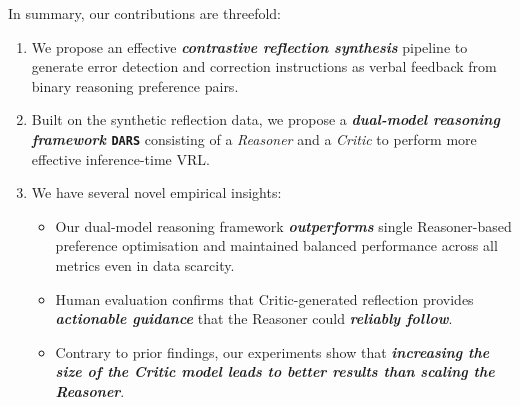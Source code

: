 In summary, our contributions are threefold:
\begin{enumerate}[leftmargin=*,noitemsep,topsep=0pt]
    \item We propose an effective \textbf{\emph{contrastive reflection synthesis}} pipeline to generate error detection and correction instructions as verbal feedback  %
    from binary reasoning preference pairs.
    \item Built on the synthetic reflection data, we propose a \textbf{\emph{dual-model reasoning framework} \texttt{DARS}} consisting of a \emph{Reasoner} and a \emph{Critic} to perform more effective inference-time VRL.
    \item We have several novel empirical insights:
    \begin{itemize}[leftmargin=*,noitemsep,topsep=0pt]
        \item Our dual-model reasoning framework \textbf{\emph{outperforms}} %
        single Reasoner-based preference optimisation and maintained balanced performance across all metrics even in data scarcity. %
        \item Human evaluation confirms that Critic-generated reflection provides \textbf{\emph{actionable guidance}} that the Reasoner could \textbf{\emph{reliably follow}}.
        \item Contrary to prior findings, our experiments show that \textbf{\emph{increasing the size of the Critic model leads to better results than scaling the Reasoner}}.
    \end{itemize}
\end{enumerate}
